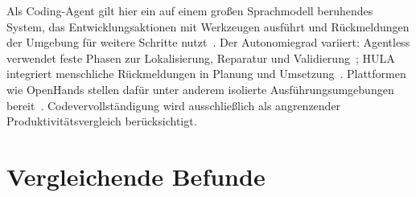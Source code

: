 \documentclass[conference]{IEEEtran}
\begin{document}
Als Coding-Agent gilt hier ein auf einem großen Sprachmodell beruhendes System, das Entwicklungsaktionen mit Werkzeugen ausführt und Rückmeldungen der Umgebung für weitere Schritte nutzt~\cite{liu2024agentsurvey}. Der Autonomiegrad variiert: Agentless verwendet feste Phasen zur Lokalisierung, Reparatur und Validierung~\cite{xia2025agentless}; HULA integriert menschliche Rückmeldungen in Planung und Umsetzung~\cite{takerngsaksiri2025hula}. Plattformen wie OpenHands stellen dafür unter anderem isolierte Ausführungsumgebungen bereit~\cite{wang2025openhands}. Codevervollständigung wird ausschließlich als angrenzender Produktivitätsvergleich berücksichtigt.

\section{Vergleichende Befunde}
\end{document}
